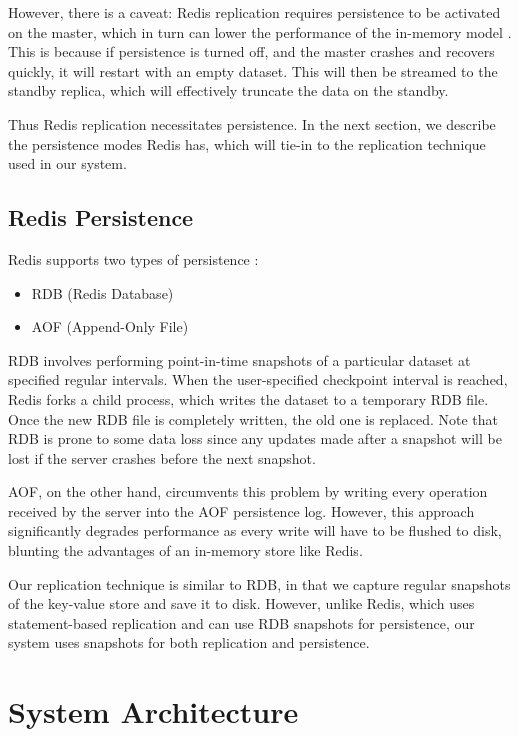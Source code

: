\documentclass[final]{proc}
\newcommand{\bit}{\begin{itemize}}
\newcommand{\eit}{\end{itemize}}
\begin{document}
However, there is a caveat: Redis replication requires persistence to be
activated on the master, which in turn can lower the performance of the
in-memory model \cite{RedisReplication}. This is because if persistence is
turned off, and the master crashes and recovers quickly, it will restart with an
empty dataset. This will then be streamed to the standby replica, which will
effectively truncate the data on the standby.

Thus Redis replication necessitates persistence. In the next section, we
describe the persistence modes Redis has, which will tie-in to the replication
technique used in our system.

\subsection{Redis Persistence}

Redis supports two types of persistence \cite{RedisPersistence}:

\bit
  \item RDB (Redis Database)
  \item AOF (Append-Only File)
\eit

RDB involves performing point-in-time snapshots of a particular dataset at
specified regular intervals. When the user-specified checkpoint interval is
reached, Redis forks a child process, which writes the dataset to a temporary
RDB file. Once the new RDB file is completely written, the old one is replaced.
Note that RDB is prone to some data loss since any updates made after a snapshot
will be lost if the server crashes before the next snapshot.

AOF, on the other hand, circumvents this problem by writing every operation
received by the server into the AOF persistence log. However, this approach
significantly degrades performance as every write will have to be flushed to
disk, blunting the advantages of an in-memory store like Redis.

Our replication technique is similar to RDB, in that we capture regular
snapshots of the key-value store and save it to disk. However, unlike Redis,
which uses statement-based replication and can use RDB snapshots for
persistence, our system uses snapshots for both replication and persistence.

\section{System Architecture}
\end{document}
